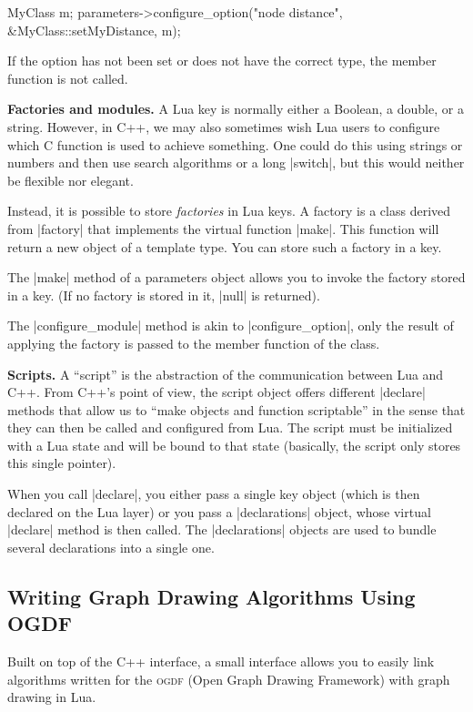 \begin{itemize}
\begin{codeexample}[code only, tikz syntax=false]
MyClass m;
parameters->configure_option("node distance", &MyClass::setMyDistance, m);
\end{codeexample}
        If the option has not been set or does not have the correct type, the
        member function is not called.
\end{itemize}


\medskip
\noindent\textbf{Factories and modules.}
A Lua key is normally either a Boolean, a double, or a string. However, in C++,
we may also sometimes wish Lua users to configure which C function is used to
achieve something. One could do this using strings or numbers and then use
search algorithms or a long |switch|, but this would neither be flexible nor
elegant.

Instead, it is possible to store \emph{factories} in Lua keys. A factory is a
class derived from |factory| that implements the virtual function |make|. This
function will return a new object of a template type. You can store such a
factory in a key.

The |make| method of a parameters object allows you to invoke the factory
stored in a key. (If no factory is stored in it, |null| is returned).

The |configure_module| method is akin to |configure_option|, only the result of
applying the factory is passed to the member function of the class.


\medskip
\noindent\textbf{Scripts.}
A ``script'' is the abstraction of the communication between Lua and C++. From
C++'s point of view, the script object offers different |declare| methods that
allow us to ``make objects and function scriptable'' in the sense that they can
then be called and configured from Lua. The script must be initialized with a
Lua state and will be bound to that state (basically, the script only stores
this single pointer).

When you call |declare|, you either pass a single key object (which is then
declared on the Lua layer) or you pass a |declarations| object, whose virtual
|declare| method is then called. The |declarations| objects are used to bundle
several declarations into a single one.


\subsection{Writing Graph Drawing Algorithms Using OGDF}
\label{section-gd-ogdf-interface}

Built on top of the C++ interface, a small interface allows you to easily link
algorithms written for the \textsc{ogdf} (Open Graph Drawing Framework) with
graph drawing in Lua.


